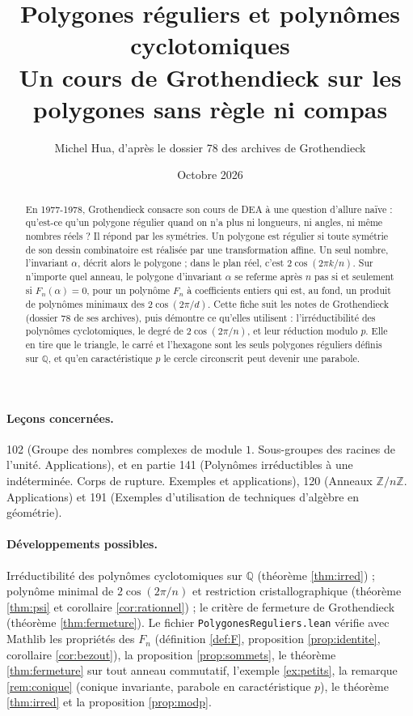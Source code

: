 \documentclass[11pt,a4paper]{article}
\title{Polygones réguliers et polynômes cyclotomiques\\[2pt]
\large Un cours de Grothendieck sur les polygones sans règle ni compas}
\author{Michel Hua, d'après le dossier 78 des archives de Grothendieck}
\date{Octobre 2026}
\theoremstyle{plain}
\theoremstyle{definition}
\theoremstyle{remark}
\newcommand{\Z}{\mathbb{Z}}
\newcommand{\Q}{\mathbb{Q}}
\begin{document}
\maketitle

\begin{abstract}
En 1977-1978, Grothendieck consacre son cours de DEA à une question d'allure naïve : qu'est-ce qu'un polygone régulier quand on n'a plus ni longueurs, ni angles, ni même nombres réels ? Il répond par les symétries. Un polygone est régulier si toute symétrie de son dessin combinatoire est réalisée par une transformation affine. Un seul nombre, l'invariant $\alpha$, décrit alors le polygone ; dans le plan réel, c'est $2\cos(2\pi k/n)$. Sur n'importe quel anneau, le polygone d'invariant $\alpha$ se referme après $n$ pas si et seulement si $F_n(\alpha)=0$, pour un polynôme $F_n$ à coefficients entiers qui est, au fond, un produit de polynômes minimaux des $2\cos(2\pi/d)$. Cette fiche suit les notes de Grothendieck (dossier 78 de ses archives), puis démontre ce qu'elles utilisent : l'irréductibilité des polynômes cyclotomiques, le degré de $2\cos(2\pi/n)$, et leur réduction modulo $p$. Elle en tire que le triangle, le carré et l'hexagone sont les seuls polygones réguliers définis sur $\Q$, et qu'en caractéristique $p$ le cercle circonscrit peut devenir une parabole.
\end{abstract}

\paragraph{Leçons concernées.} 102 (Groupe des nombres complexes de module $1$. Sous-groupes des racines de l'unité. Applications), et en partie 141 (Polynômes irréductibles à une indéterminée. Corps de rupture. Exemples et applications), 120 (Anneaux $\Z/n\Z$. Applications) et 191 (Exemples d'utilisation de techniques d'algèbre en géométrie).

\paragraph{Développements possibles.} Irréductibilité des polynômes cyclotomiques sur $\Q$ (théorème \ref{thm:irred}) ; polynôme minimal de $2\cos(2\pi/n)$ et restriction cristallographique (théorème \ref{thm:psi} et corollaire \ref{cor:rationnel}) ; le critère de fermeture de Grothendieck (théorème \ref{thm:fermeture}). Le fichier \texttt{PolygonesReguliers.lean} vérifie avec Mathlib les propriétés des $F_n$ (définition \ref{def:F}, proposition \ref{prop:identite}, corollaire \ref{cor:bezout}), la proposition \ref{prop:sommets}, le théorème \ref{thm:fermeture} sur tout anneau commutatif, l'exemple \ref{ex:petits}, la remarque \ref{rem:conique} (conique invariante, parabole en caractéristique $p$), le théorème \ref{thm:irred} et la proposition \ref{prop:modp}.
\end{document}
